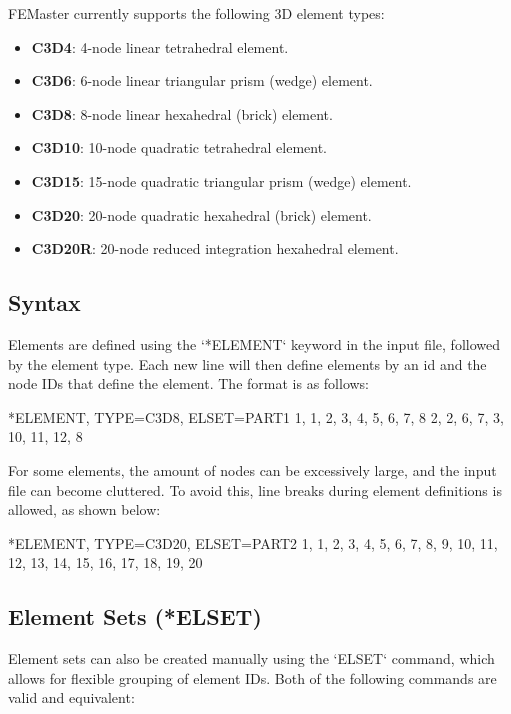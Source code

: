 FEMaster currently supports the following 3D element types:
\begin{itemize}
    \item \textbf{C3D4}: 4-node linear tetrahedral element.
    \item \textbf{C3D6}: 6-node linear triangular prism (wedge) element.
    \item \textbf{C3D8}: 8-node linear hexahedral (brick) element.
    \item \textbf{C3D10}: 10-node quadratic tetrahedral element.
    \item \textbf{C3D15}: 15-node quadratic triangular prism (wedge) element.
    \item \textbf{C3D20}: 20-node quadratic hexahedral (brick) element.
    \item \textbf{C3D20R}: 20-node reduced integration hexahedral element.
\end{itemize}

\subsection{Syntax}
Elements are defined using the `*ELEMENT` keyword in the input file,
followed by the element type. Each new line will then define elements by an id and the node IDs that define the element.
 The format is as follows:

\begin{codeBlock}
*ELEMENT, TYPE=C3D8, ELSET=PART1
1, 1, 2, 3, 4, 5, 6, 7, 8
2, 2, 6, 7, 3, 10, 11, 12, 8
\end{codeBlock}

For some elements, the amount of nodes can be excessively large, and the input file can become cluttered.
To avoid this, line breaks during element definitions is allowed, as shown below:

\begin{codeBlock}
*ELEMENT, TYPE=C3D20, ELSET=PART2
1, 1, 2, 3, 4, 5, 6, 7, 8,
   9, 10, 11, 12, 13, 14, 15, 16,
    17, 18, 19, 20
\end{codeBlock}

\subsection{Element Sets (*ELSET)}

Element sets can also be created manually using the `ELSET` command, which allows for flexible grouping of element IDs.
Both of the following commands are valid and equivalent:

